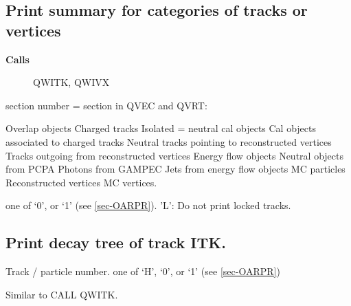 \subsection{\label{sec-QWS}Print summary for categories of
tracks or vertices}
\par
{}
\par
\begin{description}\item[\bf{Calls}]QWITK, QWIVX\end{description}
\begin{indentlist}{ 2.50cm}{ 2.75cm}
section number = section in QVEC and QVRT:
\begin{indentlist}{ 2.00cm}{ 2.25cm}
Overlap objects
Charged tracks
Isolated = neutral cal objects
Cal objects associated to charged tracks
Neutral tracks pointing to reconstructed vertices
Tracks outgoing from reconstructed vertices
Energy flow objects
Neutral objects from PCPA
Photons from GAMPEC
Jets from energy flow objects
MC particles
Reconstructed vertices
MC vertices.
\end{indentlist}
one of `0', or `1' (see \ref{sec-OARPR}).
'L': Do not print locked tracks.
\end{indentlist}
\subsection{\label{sec-QWTR}Print decay tree of track ITK.}
\par
{}
\par
\begin{indentlist}{ 2.50cm}{ 2.75cm}
Track / particle number.
one of `H', `0', or `1' (see \ref{sec-OARPR})
 
Similar to CALL QWITK.
\end{indentlist}

